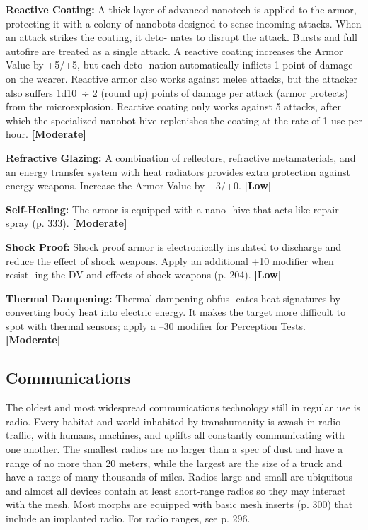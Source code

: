 \textbf{Reactive Coating:} A thick layer of advanced 
nanotech is applied to the armor, protecting it with 
a colony of nanobots designed to sense incoming 
attacks. When an attack strikes the coating, it deto-
nates to disrupt the attack. Bursts and full autofire 
are treated as a single attack. A reactive coating 
increases the Armor Value by +5/+5, but each deto-
nation automatically inflicts 1 point of damage on 
the wearer. Reactive armor also works against melee 
attacks, but the attacker also suffers 1d10 ÷ 2 (round 
up) points of damage per attack (armor protects) 
from the microexplosion. Reactive coating only 
works against 5 attacks, after which the specialized 
nanobot hive replenishes the coating at the rate of 1 
use per hour. \textbf{[Moderate]}

\textbf{Refractive Glazing:} A combination of reflectors, 
refractive metamaterials, and an energy transfer 
system with heat radiators provides extra protection 
against energy weapons. Increase the Armor Value 
by +3/+0. \textbf{[Low]}

\textbf{Self-Healing:} The armor is equipped with a nano-
hive that acts like repair spray (p. 333). \textbf{[Moderate]}

\textbf{Shock Proof:} Shock proof armor is electronically 
insulated to discharge and reduce the effect of shock 
weapons. Apply an additional +10 modifier when resist-
ing the DV and effects of shock weapons (p. 204). \textbf{[Low]}

\textbf{Thermal Dampening:} Thermal dampening obfus-
cates heat signatures by converting body heat into 
electric energy. It makes the target more difficult to 
spot with thermal sensors; apply a –30 modifier for 
Perception Tests. \textbf{[Moderate]}

\subsection{Communications}

The oldest and most widespread communications 
technology still in regular use is radio. Every habitat 
and world inhabited by transhumanity is awash in 
radio traffic, with humans, machines, and uplifts all 
constantly communicating with one another. The 
smallest radios are no larger than a spec of dust and 
have a range of no more than 20 meters, while the 
largest are the size of a truck and have a range of 
many thousands of miles. Radios large and small are 
ubiquitous and almost all devices contain at least 
short-range radios so they may interact with the 
mesh. Most morphs are equipped with basic mesh 
inserts (p. 300) that include an implanted radio. For 
radio ranges, see p. 296.

